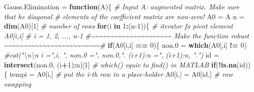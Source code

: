 \documentclass[
]{book}
\newenvironment{Shaded}{\begin{snugshade}}{\end{snugshade}}
\newcommand{\CommentTok}[1]{\textcolor[rgb]{0.56,0.35,0.01}{\textit{#1}}}
\newcommand{\ControlFlowTok}[1]{\textcolor[rgb]{0.13,0.29,0.53}{\textbf{#1}}}
\newcommand{\DecValTok}[1]{\textcolor[rgb]{0.00,0.00,0.81}{#1}}
\newcommand{\FloatTok}[1]{\textcolor[rgb]{0.00,0.00,0.81}{#1}}
\newcommand{\FunctionTok}[1]{\textcolor[rgb]{0.13,0.29,0.53}{\textbf{#1}}}
\newcommand{\NormalTok}[1]{#1}
\newcommand{\OtherTok}[1]{\textcolor[rgb]{0.56,0.35,0.01}{#1}}
\newcommand{\SpecialCharTok}[1]{\textcolor[rgb]{0.81,0.36,0.00}{\textbf{#1}}}
\begin{document}
\begin{Shaded}
\begin{Highlighting}[]
\NormalTok{Gauss.Elimination }\OtherTok{=} \ControlFlowTok{function}\NormalTok{(A)\{}
  \CommentTok{\# Input A: augmented matrix. Make sure that he diagonal }
  \CommentTok{\#          elements of the coefficient matrix are non{-}zero! }
\NormalTok{  A0 }\OtherTok{=}\NormalTok{ A        }
\NormalTok{  n }\OtherTok{=} \FunctionTok{dim}\NormalTok{(A0)[}\DecValTok{1}\NormalTok{]                }\CommentTok{\# number of rows}
  \ControlFlowTok{for}\NormalTok{(i }\ControlFlowTok{in} \DecValTok{1}\SpecialCharTok{:}\NormalTok{(n}\DecValTok{{-}1}\NormalTok{))\{            }\CommentTok{\# iterator fo pivot element A0[i,i]}
                                \CommentTok{\# i = 1, 2, ..., n{-}1}
      \CommentTok{\#\textasciitilde{}\textasciitilde{}\textasciitilde{}\textasciitilde{}\textasciitilde{}\textasciitilde{}\textasciitilde{}\textasciitilde{}\textasciitilde{}\textasciitilde{}\textasciitilde{}\textasciitilde{}\textasciitilde{}\textasciitilde{}\textasciitilde{}\textasciitilde{}\textasciitilde{}\textasciitilde{}\textasciitilde{}\textasciitilde{}\textasciitilde{}   Make the function robust  \textasciitilde{}\textasciitilde{}\textasciitilde{}\textasciitilde{}\textasciitilde{}\textasciitilde{}\textasciitilde{}\textasciitilde{}\textasciitilde{}\textasciitilde{}\textasciitilde{}\textasciitilde{}\textasciitilde{}\textasciitilde{}\textasciitilde{}\textasciitilde{}\textasciitilde{}\textasciitilde{}\textasciitilde{}\textasciitilde{}\textasciitilde{}\textasciitilde{}\textasciitilde{}\textasciitilde{}\textasciitilde{}\#}
      \ControlFlowTok{if}\NormalTok{(A0[i,i] }\SpecialCharTok{==} \DecValTok{0}\NormalTok{)\{}
\NormalTok{          non}\FloatTok{.0} \OtherTok{=} \FunctionTok{which}\NormalTok{(A0[,i] }\SpecialCharTok{!=} \DecValTok{0}\NormalTok{)}
              \CommentTok{\#cat("\textbackslash{}n\textbackslash{}n i =",i, ", non.0 =", non.0,". (i+1):n =", (i+1):n, ".")}
\NormalTok{              id }\OtherTok{=} \FunctionTok{intersect}\NormalTok{(non}\FloatTok{.0}\NormalTok{, (i}\SpecialCharTok{+}\DecValTok{1}\NormalTok{)}\SpecialCharTok{:}\NormalTok{n)[}\DecValTok{1}\NormalTok{] }\CommentTok{\# which() equiv to find() in MATLAB}
              \ControlFlowTok{if}\NormalTok{(}\SpecialCharTok{!}\FunctionTok{is.na}\NormalTok{(id))\{}
\NormalTok{              tempi }\OtherTok{=}\NormalTok{ A0[i,]                    }\CommentTok{\# put the i{-}th row in a place{-}holder}
\NormalTok{              A0[i,] }\OtherTok{=}\NormalTok{ A0[id,]                  }\CommentTok{\# row swapping}

\end{Highlighting}
\end{Shaded}
\end{document}
